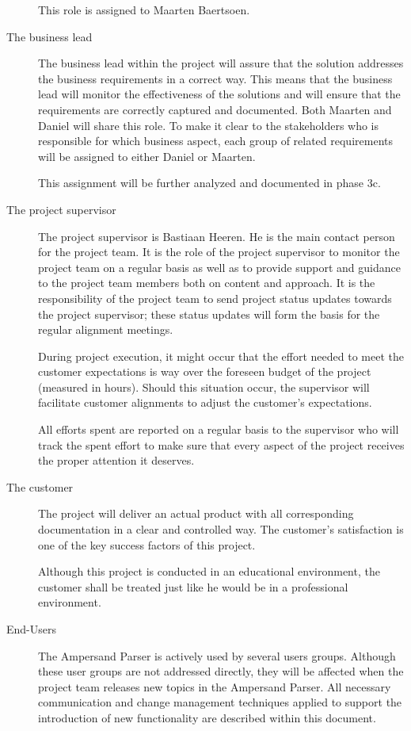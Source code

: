 \begin{description}
	This role is assigned to Maarten Baertsoen.

	\item[The business lead]
	The business lead within the project will assure that the solution addresses the business requirements in a correct way. 
	This means that the business lead will monitor the effectiveness of the solutions and will ensure that the requirements are correctly captured and documented.
	Both Maarten and Daniel will share this role.
	To make it clear to the stakeholders who is responsible for which business aspect, each group of related requirements will be assigned to either Daniel or Maarten.

	This assignment  will be further analyzed and documented in phase 3c.

	\item[The project supervisor]
	The project supervisor is Bastiaan Heeren.
	He is the main contact person for the project team.
	It is the role of the project supervisor to monitor the project team on a regular basis as well as to provide support and guidance to the project team members both on content and approach.
	It is the responsibility of the project team to send project status updates towards the project supervisor; these status updates will form the basis for the regular alignment meetings.

	During project execution, it might occur that the effort needed to meet the customer expectations is way over the foreseen budget of the project (measured in hours).
	Should this situation occur, the supervisor will facilitate customer alignments to adjust the customer's expectations.

	All efforts spent are reported on a regular basis to the supervisor who will track the spent effort to make sure that every aspect of the project receives the proper attention it deserves.

	\item[The customer]
	The project will deliver an actual product with all corresponding documentation in a clear and controlled way.
	The customer's satisfaction is one of the key success factors of this project.

	Although this project is conducted in an educational environment, the customer shall be treated just like he would be in a professional environment.

	\item[End-Users]
	The Ampersand Parser is actively used by several users groups.
	Although these user groups are not addressed directly, they will be affected when the project team releases new topics in the Ampersand Parser.
	All necessary communication and change management techniques applied to support the introduction of new functionality are described within this document.


\end{description}

